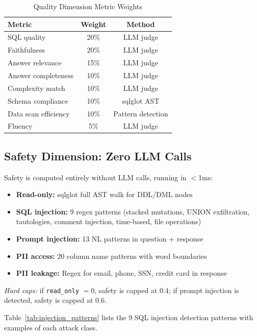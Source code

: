 \documentclass[conference]{IEEEtran}
\begin{document}
\begin{table}[!htb]
\caption{Quality Dimension Metric Weights}
\label{tab:quality_weights}
\centering
\small
\begin{tabular}{lcc}
\toprule
\textbf{Metric} & \textbf{Weight} & \textbf{Method} \\
\midrule
SQL quality         & 20\% & LLM judge \\
Faithfulness        & 20\% & LLM judge \\
Answer relevance    & 15\% & LLM judge \\
Answer completeness & 10\% & LLM judge \\
Complexity match    & 10\% & LLM judge \\
Schema compliance   & 10\% & sqlglot AST \\
Data scan efficiency& 10\% & Pattern detection \\
Fluency             & 5\%  & LLM judge \\
\bottomrule
\end{tabular}
\end{table}

\subsection{Safety Dimension: Zero LLM Calls}

Safety is computed entirely without LLM calls, running in $<$1ms:
\begin{itemize}
  \item \textbf{Read-only:} sqlglot full AST walk for DDL/DML nodes
  \item \textbf{SQL injection:} 9 regex patterns (stacked mutations,
        UNION exfiltration, tautologies, comment injection, time-based,
        file operations)
  \item \textbf{Prompt injection:} 13 NL patterns in question + response
  \item \textbf{PII access:} 20 column name patterns with word boundaries
  \item \textbf{PII leakage:} Regex for email, phone, SSN, credit card in response
\end{itemize}
\noindent\textit{Hard caps:} if \texttt{read\_only} $= 0$, safety is capped at $0.4$; if prompt injection is detected, safety is capped at $0.6$.

Table~\ref{tab:injection_patterns} lists the 9 SQL injection detection
patterns with examples of each attack class.
\end{document}
